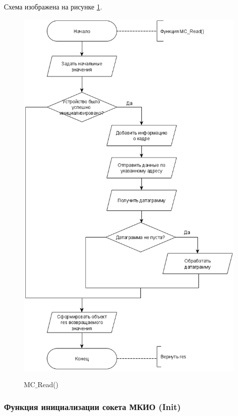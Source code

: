 	Схема изображена на рисунке \ref{fig13:image}.
	
	\begin{figure}[ph!]
		\centering
		\begin{center}
			{\includegraphics[scale=0.5]{schemes/mc_read.png}}
			\caption{MC$\_$Read()}
			\label{fig13:image}
		\end{center}
	\end{figure}

	\subsubsection{Функция инициализации сокета МКИО (Init)}
	
